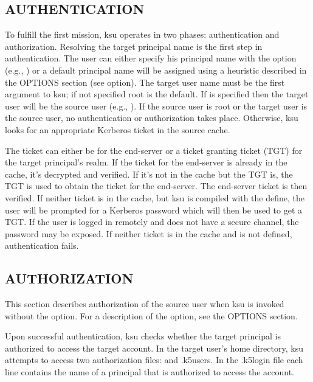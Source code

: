 \documentclass[letterpaper,10pt,english]{sphinxmanual}
\begin{document}
\subsection{AUTHENTICATION}
\label{\detokenize{user/user_commands/ksu:authentication}}
To fulfill the first mission, ksu operates in two phases:
authentication and authorization.  Resolving the target principal name
is the first step in authentication.  The user can either specify his
principal name with the  option (e.g., )
or a default principal name will be assigned using a heuristic
described in the OPTIONS section (see  option).  The target user
name must be the first argument to ksu; if not specified root is the
default.  If  is specified then the target user will be the
source user (e.g., ).  If the source user is root or the
target user is the source user, no authentication or authorization
takes place.  Otherwise, ksu looks for an appropriate Kerberos ticket
in the source cache.

The ticket can either be for the end-server or a ticket granting
ticket (TGT) for the target principal’s realm.  If the ticket for the
end-server is already in the cache, it’s decrypted and verified.  If
it’s not in the cache but the TGT is, the TGT is used to obtain the
ticket for the end-server.  The end-server ticket is then verified.
If neither ticket is in the cache, but ksu is compiled with the
 define, the user will be prompted for a
Kerberos password which will then be used to get a TGT.  If the user
is logged in remotely and does not have a secure channel, the password
may be exposed.  If neither ticket is in the cache and
 is not defined, authentication fails.


\subsection{AUTHORIZATION}
\label{\detokenize{user/user_commands/ksu:authorization}}
This section describes authorization of the source user when ksu is
invoked without the  option.  For a description of the 
option, see the OPTIONS section.

Upon successful authentication, ksu checks whether the target
principal is authorized to access the target account.  In the target
user’s home directory, ksu attempts to access two authorization files:
{\hyperref[\detokenize{user/user_config/k5login:k5login-5}]{}} and .k5users.  In the .k5login file each line
contains the name of a principal that is authorized to access the
account.
\end{document}
